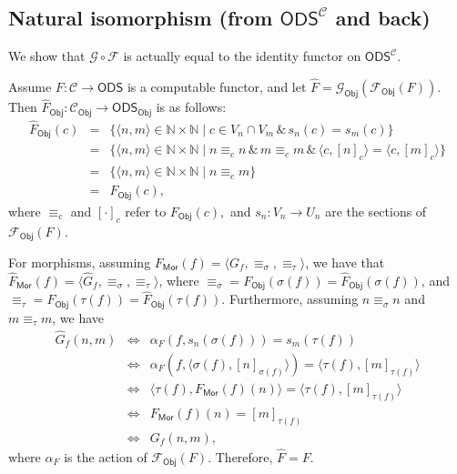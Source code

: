 \documentclass[envcountsame]{llncs}
\def\IN{{\mathbb N}}
\def\calC{{\mathcal{C}}}
\def\calF{{\mathcal{F}}}
\def\calG{{\mathcal{G}}}
\newcommand{\cntSets}{{\mathsf{ODS}}}
\newcommand{\Mor}{\mathsf{Mor}}
\newcommand{\Obj}{\mathsf{Obj}}
\def\src{{\sigma}}
\def\tar{{\tau}}
\begin{document}
\subsection{Natural isomorphism (from $\cntSets^\calC$ and back)}

We show that $\calG\circ\calF$ is actually equal to the identity functor on $\cntSets^\calC$.


Assume $F\colon \calC \to\cntSets$ is a computable functor, and let $\widehat{F} = \calG_\Obj(\calF_\Obj(F))$. Then $\widehat{F}_\Obj\colon \calC_\Obj\to \cntSets_\Obj$ is as follows:
\begin{eqnarray*}
\widehat{F}_\Obj(c) &=& \{\langle n,m\rangle \in \IN\times\IN \mid c\in V_n\cap V_m \,\&\, s_n(c)=s_m(c)\}\\
&=& \{\langle n,m\rangle \in \IN\times\IN \mid n \equiv_c n \,\&\, m \equiv_c m  \,\&\, \langle c,[n]_c\rangle=\langle c,[m]_c\rangle\}\\
&=& \{\langle n,m\rangle \in \IN\times\IN \mid n \equiv_c m \}\\
&=& F_{\Obj}(c),
\end{eqnarray*}
where $\equiv_c$ and $[\cdot]_c$ refer to $F_\Obj(c),$ and $s_n\colon V_n \to U_n$ are the sections of $\calF_\Obj(F)$.

For morphisms, assuming $F_\Mor(f) = \langle G_f, \equiv_\src, \equiv_\tar\rangle$, we have that $\widehat{F}_\Mor(f) =\langle \widehat{G}_f, \equiv_\src,\equiv_\tar\rangle$, where $\equiv_\src = F_\Obj(\src(f)) = \widehat{F}_\Obj(\src(f))$, and $\equiv_\tar = F_\Obj(\tar(f)) =  \widehat{F}_\Obj(\tar(f))$. Furthermore, assuming $n \equiv_\src n$ and $m \equiv_\tar m$, we have
\begin{eqnarray*}
\widehat{G}_f(n,m) &\iff& \alpha_F(f,s_n(\src(f))) = s_m(\tar(f))\\
&\iff& \alpha_F(f,\langle \src(f),[n]_{\src(f)}\rangle) = \langle \tar(f),[m]_{\tar(f)}\rangle \\
&\iff& \langle \tar(f), F_\Mor(f)(n)\rangle= \langle \tar(f),[m]_{\tar(f)}\rangle \\
&\iff& F_\Mor(f)(n)= [m]_{\tar(f)} \\
&\iff& G_f(n,m),
\end{eqnarray*}
where $\alpha_F$ is the action of $\calF_\Obj(F)$. Therefore, $\widehat{F} = F$.
\end{document}
